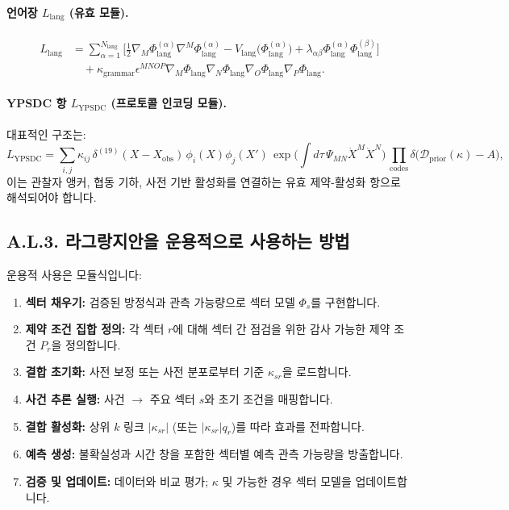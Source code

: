 \documentclass[13pt,a4paper]{article}
\begin{document}
	\paragraph{언어장 $L_{\mathrm{lang}}$ (유효 모듈).}
	\begin{align}
		L_{\mathrm{lang}} &= \sum_{\alpha=1}^{N_{\mathrm{lang}}}\Big[
		\frac{1}{2}\nabla_M\Phi_{\mathrm{lang}}^{(\alpha)}\nabla^M\Phi_{\mathrm{lang}}^{(\alpha)}
		- V_{\mathrm{lang}}\big(\Phi_{\mathrm{lang}}^{(\alpha)}\big)
		+ \lambda_{\alpha\beta}\Phi_{\mathrm{lang}}^{(\alpha)}\Phi_{\mathrm{lang}}^{(\beta)}
		\Big] \nonumber\\
		&\quad + \kappa_{\mathrm{grammar}}\epsilon^{MNOP}\nabla_M\Phi_{\mathrm{lang}}\nabla_N\Phi_{\mathrm{lang}}\nabla_O\Phi_{\mathrm{lang}}\nabla_P\Phi_{\mathrm{lang}}.
	\end{align}
	
	\paragraph{YPSDC 항 $L_{\mathrm{YPSDC}}$ (프로토콜 인코딩 모듈).}
	대표적인 구조는:
	\begin{equation}
		L_{\mathrm{YPSDC}} = \sum_{i,j}\kappa_{ij}\,\delta^{(19)}(X-X_{\mathrm{obs}})\,\phi_i(X)\phi_j(X')\,
		\exp\!\Big(\int d\tau\,\Psi_{MN}\dot X^M\dot X^N\Big)\,
		\prod_{\mathrm{codes}}\delta\big(\mathcal{D}_{\mathrm{prior}}(\kappa)-A\big),
	\end{equation}
	이는 관찰자 앵커, 협동 기하, 사전 기반 활성화를 연결하는 유효 제약-활성화 항으로 해석되어야 합니다.
	
	\subsection*{A.L.3. 라그랑지안을 운용적으로 사용하는 방법}
	운용적 사용은 모듈식입니다:
	\begin{enumerate}[leftmargin=*]
		\item \textbf{섹터 채우기:} 검증된 방정식과 관측 가능량으로 섹터 모델 $\Phi_s$를 구현합니다.
		\item \textbf{제약 조건 집합 정의:} 각 섹터 $r$에 대해 섹터 간 점검을 위한 감사 가능한 제약 조건 $P_r$을 정의합니다.
		\item \textbf{결합 초기화:} 사전 보정 또는 사전 분포로부터 기준 $\kappa_{sr}$을 로드합니다.
		\item \textbf{사건 추론 실행:} 사건 $\to$ 주요 섹터 $s$와 초기 조건을 매핑합니다.
		\item \textbf{결합 활성화:} 상위 $k$ 링크 $|\kappa_{sr}|$ (또는 $|\kappa_{sr}|q_r$)를 따라 효과를 전파합니다.
		\item \textbf{예측 생성:} 불확실성과 시간 창을 포함한 섹터별 예측 관측 가능량을 방출합니다.
		\item \textbf{검증 및 업데이트:} 데이터와 비교 평가; $\kappa$ 및 가능한 경우 섹터 모델을 업데이트합니다.
	\end{enumerate}
	
\end{document}
